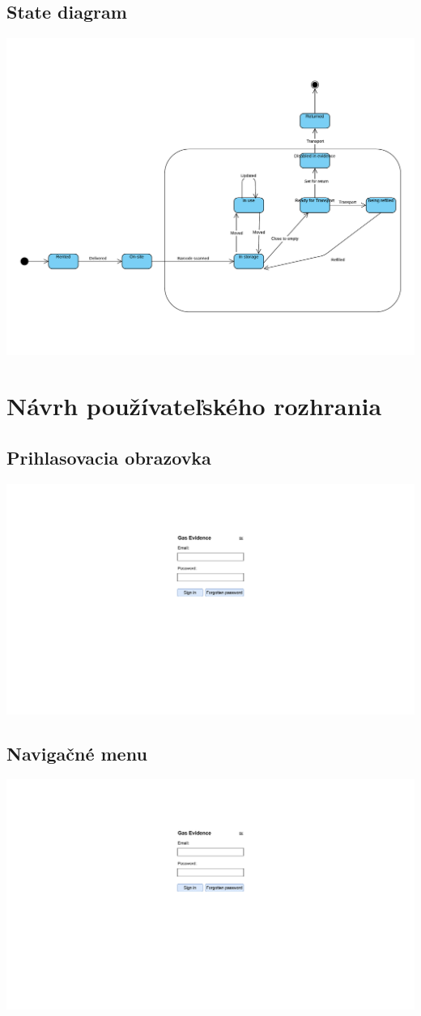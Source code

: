 \documentclass{zah}
\begin{document}
\subsection{State diagram}
\includegraphics[width=\textwidth]{navrh-assets/state}

\section{Návrh používateľského rozhrania}

\subsection{Prihlasovacia obrazovka}
\begin{center}
\includegraphics[width=.7\textwidth,page=1]{navrh-assets/ui}
\end{center}

\subsection{Navigačné menu}
\begin{center}
\includegraphics[width=.7\textwidth,page=2]{navrh-assets/ui}
\end{center}
\end{document}
